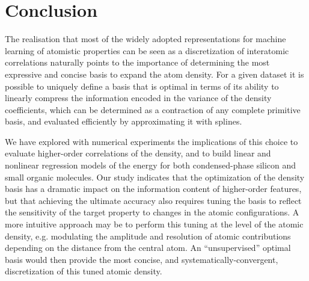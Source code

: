
\section{Conclusion}

The realisation that most of the widely adopted representations for machine learning of atomistic properties can be seen as a discretization of interatomic correlations naturally points to the importance of determining the most expressive and concise basis to expand the atom density. 
For a given dataset it is possible to  uniquely define a basis that is optimal in terms of its ability to linearly compress the information encoded in the variance of the density coefficients, which can be determined as a contraction of any complete primitive basis, and evaluated efficiently by approximating it with splines. 

We have explored with numerical experiments the implications of this choice to evaluate higher-order correlations of the density, and to build linear and nonlinear regression models of the energy for both condensed-phase silicon and small organic molecules. 
Our study indicates that the optimization of the density basis has a dramatic impact on the information content of higher-order features, but that
achieving the ultimate accuracy also requires tuning the basis to reflect the sensitivity of the target property to changes in the atomic configurations.
A more intuitive approach may be to perform this tuning at the level of the atomic density, e.g. modulating the amplitude and resolution of atomic contributions depending on the distance from the central atom.
An ``unsupervised'' optimal basis would then provide the most concise, and systematically-convergent, discretization of this tuned atomic density. 


